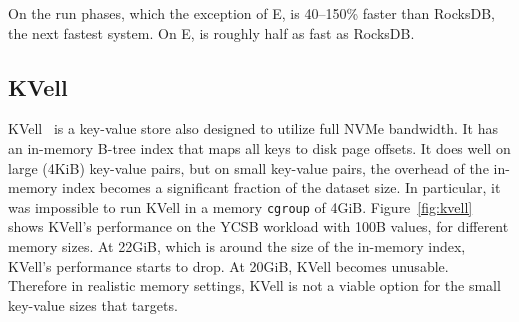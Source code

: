 On the run phases, which the exception of E, \sysname is 40--150\% faster than
RocksDB, the next fastest system. On E, \sysname is roughly half as fast as
RocksDB.


\subsection{KVell}\label{sec:kvell}

KVell~\cite{DBLP:conf/sosp/LepersBGZ19} is a key-value store also designed to
utilize full NVMe bandwidth.  It has an in-memory B-tree index that maps all
keys to disk page offsets.  It does well on large (4KiB) key-value pairs, but
on small key-value pairs, the overhead of the in-memory index becomes a
significant fraction of the dataset size.  In particular, it was impossible to
run KVell in a memory \texttt{cgroup} of 4GiB.  Figure~\ref{fig:kvell} shows
KVell's performance on the YCSB workload with 100B values, for different memory
sizes. At 22GiB, which is around the size of the in-memory index, KVell's
performance starts to drop. At 20GiB, KVell becomes unusable. Therefore in
realistic memory settings, KVell is not a viable option for the small key-value
sizes that \sysname targets.

